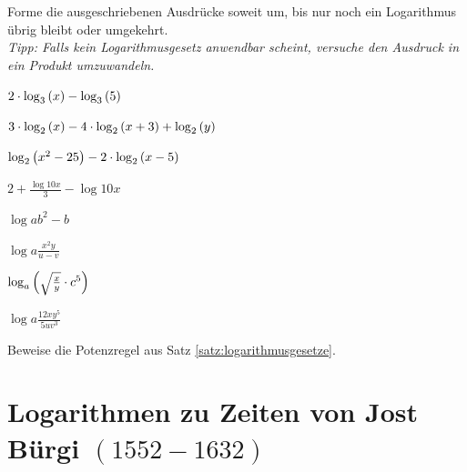 \documentclass[11pt,oneside]{article}
\begin{document}
	\begin{aufgabe}
		Forme die ausgeschriebenen Ausdrücke soweit um, bis nur noch ein Logarithmus übrig bleibt oder umgekehrt. \\\footnotesize\textit{Tipp: Falls kein Logarithmusgesetz anwendbar scheint, versuche den Ausdruck in ein Produkt umzuwandeln.}\normalsize
		\begin{enumcols}[2]
				\item $2\*\log{3}{x}-\log{3}{5}$
				\item $3\*\log{2}{x}-4\*\log{2}{x+3}+\log{2}{y}$
				\item $\log{2}{x^2-25}-2\*\log{2}{x-5}$
				\item $2+\frac{\log{10}{x}}{3}-\log{10}{x}$
				\item $\log{a}{b^2-b}$
				\item $\log{a}{\frac{x^2y}{u-v}}$
				\item $\log{a}{\sqrt{\frac{x}{y}}\*c^5}$
				\item $\log{a}{\frac{12xy^5}{5uv^3}}$
		\end{enumcols}
	\end{aufgabe}
	\begin{aufgabe}
		Beweise die Potenzregel aus Satz \ref{satz:logarithmusgesetze}.
	\end{aufgabe}



\newpage
\section{Logarithmen zu Zeiten von Jost Bürgi $(1552-1632)$}


\newpage
\end{document}
